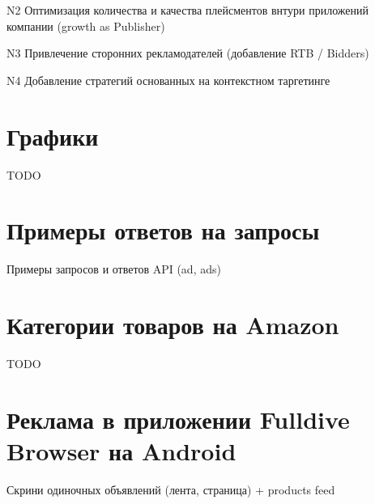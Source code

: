 \documentclass[times]{itmo-student-thesis}
\begin{document}
N2 Оптимизация количества и качества плейсментов внтури приложений компании (growth as Publisher)

N3 Привлечение сторонних рекламодателей (добавление RTB / Bidders)

N4 Добавление стратегий основанных на контекстном таргетинге

\printmainbibliography


\appendix

\chapter{Графики}\label{sec:app:1}

TODO

\chapter{Примеры ответов на запросы}\label{sec:app:2}

Примеры запросов и ответов API (ad, ads)

\chapter{Категории товаров на Amazon}\label{sec:app:3}

TODO

\chapter{Реклама в приложении Fulldive Browser на Android}\label{sec:app:4}

Скрини одиночных объявлений (лента, страница) + products feed
\end{document}
